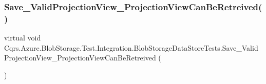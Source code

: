\subsubsection{\texorpdfstring{Save\+\_\+\+Valid\+Projection\+View\+\_\+\+Projection\+View\+Can\+Be\+Retreived()}{Save\_ValidProjectionView\_ProjectionViewCanBeRetreived()}}
{\footnotesize\ttfamily virtual void Cqrs.\+Azure.\+Blob\+Storage.\+Test.\+Integration.\+Blob\+Storage\+Data\+Store\+Tests.\+Save\+\_\+\+Valid\+Projection\+View\+\_\+\+Projection\+View\+Can\+Be\+Retreived (\begin{DoxyParamCaption}{ }\end{DoxyParamCaption})\hspace{0.3cm}{\ttfamily [virtual]}}

